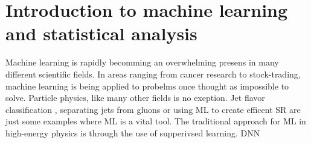 \chapter{Introduction to machine learning and statistical analysis}\label{chap:Intro ML}
Machine learning is rapidly becomming an overwhelming presens in many different scientific fields.
In areas ranging from cancer research to stock-trading, machine learning is being applied to probelms
once thought as impossible to solve. Particle physics, like many other fields is no exeption. Jet flavor classification \cite{Guest_2016}, 
separating jets from gluons \cite{PhysRevD.44.2025} or using \ac{ML} to create efficent \ac{SR} are just some examples
where \ac{ML} is a vital tool. The traditional approach for ML in high-energy physics is through the use 
of supperivsed learning. \ac{DNN}

